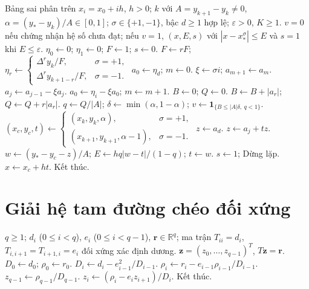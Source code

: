 \documentclass[12pt,a4paper,oneside]{book}
\numberwithin{algorithm}{chapter}
\theoremstyle{definition}
\newcommand{\R}{\mathbb{R}}
\begin{document}
\begin{algorithm}[H]
\caption{Nội suy ngược theo hướng tiến hoặc lùi -- chi tiết}
\label{alg:inv-two-directions-detailed}
\small
\begin{algorithmic}[1]
\Require Bảng sai phân trên $x_i=x_0+ih$, $h>0$; $k$ với $A=y_{k+1}-y_k\ne0$, $\alpha=(y_\ast-y_k)/A\in[0,1]$; $\sigma\in\{+1,-1\}$, bậc $d\geq1$ hợp lệ; $\varepsilon>0$, $K\geq1$.
\Ensure $v=0$ nếu chứng nhận hệ số chưa đạt; nếu $v=1$, $(x,E,s)$ với $|x-x_*^\sigma|\leq E$ và $s=1$ khi $E\leq\varepsilon$.
\State $\eta_0\gets0$; $\eta_1\gets0$; $F\gets1$; $s\gets0$.
  \State $F\gets rF$; $\eta_r\gets\begin{cases}\Delta^ry_k/F,&\sigma=+1,\\\Delta^ry_{k+1-r}/F,&\sigma=-1.\end{cases}$
\EndFor
\Statex
\State $a_0\gets\eta_d$; $m\gets0$.
  \State $\xi\gets\sigma i$; $a_{m+1}\gets a_m$.
    \State $a_j\gets a_{j-1}-\xi a_j$.
  \EndFor
  \Statex
  \State $a_0\gets\eta_i-\xi a_0$; $m\gets m+1$.
\EndFor
\Statex
\State $B\gets0$; $Q\gets0$.
  \State $B\gets B+|a_r|$; $Q\gets Q+r|a_r|$.
\EndFor
\Statex
\State $q\gets Q/|A|$; $\delta\gets\min(\alpha,1-\alpha)$; $v\gets\mathbf1_{\{B\leq|A|\delta,\ q<1\}}$.
  \State $(x_c,y_c,t)\gets\begin{cases}(x_k,y_k,\alpha),&\sigma=+1,\\(x_{k+1},y_{k+1},\alpha-1),&\sigma=-1.\end{cases}$
    \State $z\gets a_d$.
      \State $z\gets a_j+tz$.
    \EndFor
    \Statex
    \State $w\gets(y_\ast-y_c-z)/A$; $E\gets hq|w-t|/(1-q)$; $t\gets w$.
      \State $s\gets1$; Dừng lặp.
    \EndIf
    \Statex
  \EndFor
  \Statex
  \State $x\gets x_c+ht$.
\EndIf
\Statex
\State Kết thúc.
\end{algorithmic}
\end{algorithm}


\section{Giải hệ tam đường chéo đối xứng}
\begin{algorithm}[H]
\caption{Giải hệ tam đường chéo bằng khử và thế ngược}
\label{alg:spl-thomas}
\begin{algorithmic}[1]
\Require $q\geq1$; $d_i$ ($0\leq i<q$), $e_i$ ($0\leq i<q-1$), $\mathbf r\in\R^q$; ma trận $T_{ii}=d_i$, $T_{i,i+1}=T_{i+1,i}=e_i$ đối xứng xác định dương.
\Ensure $\mathbf z=(z_0,\ldots,z_{q-1})^T$, $T\mathbf z=\mathbf r$.
\State $D_0\gets d_0$; $\rho_0\gets r_0$.
  \State $D_i\gets d_i-e_{i-1}^2/D_{i-1}$.
  \State $\rho_i\gets r_i-e_{i-1}\rho_{i-1}/D_{i-1}$.
\EndFor
\Statex
\State $z_{q-1}\gets\rho_{q-1}/D_{q-1}$.
  \State $z_i\gets(\rho_i-e_iz_{i+1})/D_i$.
\EndFor
\Statex
\State Kết thúc.
\end{algorithmic}
\end{algorithm}
\end{document}

